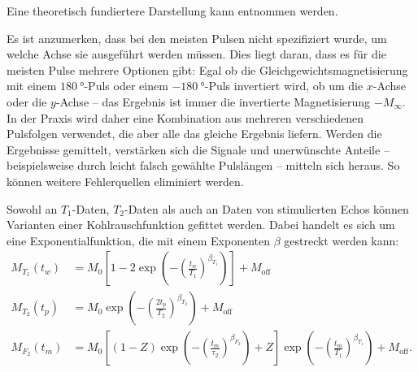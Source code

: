 Eine theoretisch fundiertere Darstellung kann \cite[insb. Kap. 6.2 und Kap. 10.2.3]{schmidt-rohr_multidimensional_1994} entnommen werden.

Es ist anzumerken, dass bei den meisten Pulsen nicht spezifiziert wurde, um welche Achse sie ausgeführt werden müssen. Dies liegt daran, dass es für die meisten Pulse mehrere Optionen gibt: Egal ob die Gleichgewichtsmagnetisierung mit einem $\SI{180}{\degree}$-Puls oder einem $\SI{-180}{\degree}$-Puls invertiert wird, ob um die $x$-Achse oder die $y$-Achse -- das Ergebnis ist immer die invertierte Magnetisierung $-M_\infty$. In der Praxis wird daher eine Kombination aus mehreren verschiedenen Pulsfolgen verwendet, die aber alle das gleiche Ergebnis liefern. Werden die Ergebnisse gemittelt, verstärken sich die Signale und unerwünschte Anteile -- beispielsweise durch leicht falsch gewählte Pulslängen -- mitteln sich heraus. So können weitere Fehlerquellen eliminiert werden.


Sowohl an $T_1$-Daten, $T_2$-Daten als auch an Daten von stimulierten Echos können Varianten einer Kohlrauschfunktion gefittet werden. Dabei handelt es sich um eine Exponentialfunktion, die mit einem Exponenten $\beta$ gestreckt werden kann:
\begin{align}
	M_{T_1} (t_w) & = M_0 \left[ 1 - 2 \exp{ \left(- { \left( \frac{t_w}{T_1} \right) }^{\beta_{T_1}} \right)} \right] + M_\text{off} \label{eqn:theo:T_1_fit}                                                                     \\
	M_{T_2} (t_p) & = M_0 \exp{ \left(- { \left( \frac{2 t_p}{T_2} \right) }^{\beta_{T_2}} \right)} + M_\text{off} \label{eqn:theo:T_2_fit}                                                                                        \\
	M_{F_2} (t_m) & = M_0 \left[  \left(1 - Z\right) \exp\left(- \left(\frac{t_m}{\tau_2}\right)^{\beta_{F_2}}\right) + Z \right] \exp\left(- \left(\frac{t_m}{T_1}\right)^{\beta_{T_1}}\right) + M_\text{off}. \label{eqn:theo:F_2_fit}
\end{align}

